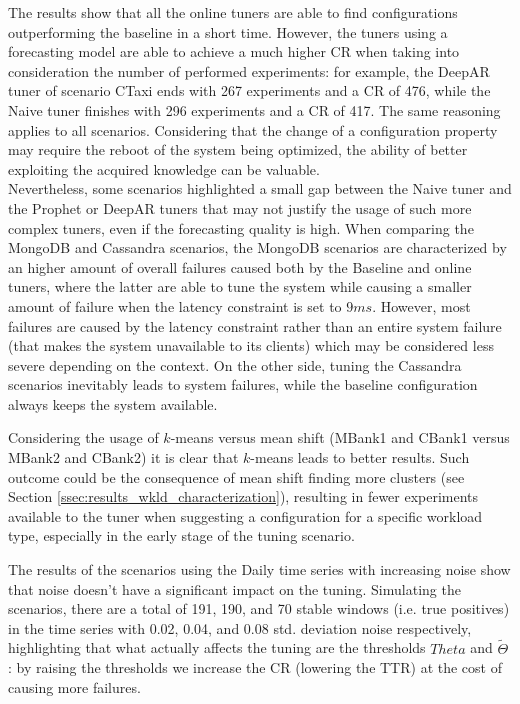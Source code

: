 \documentclass[a4paper, 12pt]{article} %
\begin{document}
	The results show that all the online tuners are able to find configurations outperforming the baseline in a short time. However, the tuners using a forecasting model are able to achieve a much higher CR when taking into consideration the number of performed experiments: for example, the DeepAR tuner of scenario CTaxi ends with 267 experiments and a CR of 476, while the Naive tuner finishes with 296 experiments and a CR of 417. The same reasoning applies to all scenarios. Considering that the change of a configuration property may require the reboot of the system being optimized, the ability of better exploiting the acquired knowledge can be valuable. \\
	Nevertheless, some scenarios highlighted a small gap between the Naive tuner and the Prophet or DeepAR tuners that may not justify the usage of such more complex tuners, even if the forecasting quality is high.
	When comparing the MongoDB and Cassandra scenarios, the MongoDB scenarios are characterized by an higher amount of overall failures caused both by the Baseline and online tuners, where the latter are able to tune the system while causing a smaller amount of failure when the latency constraint is set to $9ms$. However, most failures are caused by the latency constraint rather than an entire system failure (that makes the system unavailable to its clients) which may be considered less severe depending on the context. On the other side, tuning the Cassandra scenarios inevitably leads to system failures, while the baseline configuration always keeps the system available. 
	
	Considering the usage of $k$-means versus mean shift (MBank1 and CBank1 versus MBank2 and CBank2) it is clear that $k$-means leads to better results. Such outcome could be the consequence of mean shift finding more clusters (see Section \ref{ssec:results_wkld_characterization}), resulting in fewer experiments available to the tuner when suggesting a configuration for a specific workload type, especially in the early stage of the tuning scenario. 

	The results of the scenarios using the Daily time series with increasing noise show that noise doesn't have a significant impact on the tuning. Simulating the scenarios, there are a total of 191, 190, and 70 stable windows (i.e. true positives) in the time series with 0.02, 0.04, and 0.08 std. deviation noise respectively, highlighting that  what actually affects the tuning are the thresholds $Theta$ and $\tilde{\Theta}$: by raising the thresholds we increase the CR (lowering the TTR) at the cost of causing more failures. 
	
\end{document}
